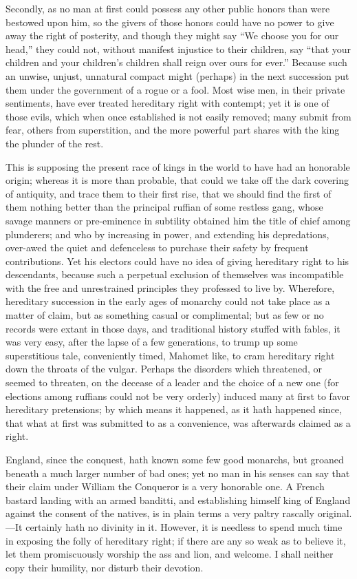 \documentclass[12pt,oneside]{memoir}
\begin{document}
Secondly, as no man at first could possess any other public honors
than were bestowed upon him, so the givers of those honors could
have no power to give away the right of posterity, and though they
might say ``We choose you for our head,'' they could not, without
manifest injustice to their children, say ``that your children and
your children's children shall reign over ours for ever.'' Because
such an unwise, unjust, unnatural compact might (perhaps) in the
next succession put them under the government of a rogue or a fool.
Most wise men, in their private sentiments, have ever treated
hereditary right with contempt; yet it is one of those evils, which
when once established is not easily removed; many submit from fear,
others from superstition, and the more powerful part shares with the
king the plunder of the rest.

This is supposing the present race of kings in the world to have had
an honorable origin; whereas it is more than probable, that could we
take off the dark covering of antiquity, and trace them to their
first rise, that we should find the first of them nothing better
than the principal ruffian of some restless gang, whose savage
manners or pre-eminence in subtility obtained him the title of chief
among plunderers; and who by increasing in power, and extending his
depredations, over-awed the quiet and defenceless to purchase their
safety by frequent contributions. Yet his electors could have no
idea of giving hereditary right to his descendants, because such a
perpetual exclusion of themselves was incompatible with the free and
unrestrained principles they professed to live by. Wherefore,
hereditary succession in the early ages of monarchy could not take
place as a matter of claim, but as something casual or complimental;
but as few or no records were extant in those days, and traditional
history stuffed with fables, it was very easy, after the lapse of a
few generations, to trump up some superstitious tale, conveniently
timed, Mahomet like, to cram hereditary right down the throats of
the vulgar. Perhaps the disorders which threatened, or seemed to
threaten, on the decease of a leader and the choice of a new one
(for elections among ruffians could not be very orderly) induced
many at first to favor hereditary pretensions; by which means it
happened, as it hath happened since, that what at first was
submitted to as a convenience, was afterwards claimed as a right.

England, since the conquest, hath known some few good monarchs, but
groaned beneath a much larger number of bad ones; yet no man in his
senses can say that their claim under William the Conqueror is a
very honorable one. A French bastard landing with an armed banditti,
and establishing himself king of England against the consent of the
natives, is in plain terms a very paltry rascally original.---It
certainly hath no divinity in it. However, it is needless to spend
much time in exposing the folly of hereditary right; if there are
any so weak as to believe it, let them promiscuously worship the ass
and lion, and welcome. I shall neither copy their humility, nor
disturb their devotion.
\end{document}
